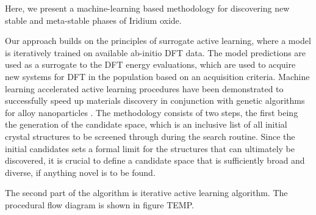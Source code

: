 

Here, we present a machine-learning based methodology for discovering new stable and meta-stable phases of Iridium oxide.

Our approach builds on the principles of surrogate active learning, where a model is iteratively trained on available ab-initio DFT data. The model predictions are used as a surrogate to the DFT energy evaluations, which are used to acquire new systems for DFT in the population based on an acquisition criteria.
%
Machine learning accelerated active learning procedures have been demonstrated to successfully speed up materials discovery in conjunction with genetic algorithms for alloy nanoparticles \cite{Jennings2019, EXAMPLE_1, and EXAMPLE_2}.
The methodology consists of two steps, the first being the generation of the candidate space,
which is an inclusive list of all initial crystal structures to be screened through during the search routine. Since the initial candidates sets a formal limit for the structures that can ultimately be discovered, it is crucial to define a candidate space that is sufficiently broad and diverse, if anything novel is to be found.

%
The second part of the algorithm is iterative active learning algorithm.
The procedural flow diagram is shown in figure TEMP.

